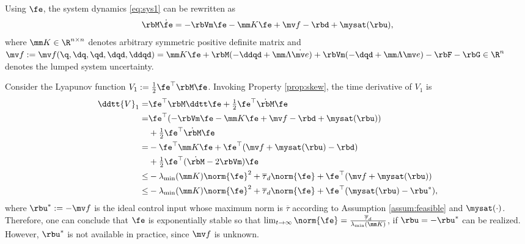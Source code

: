 \documentclass[lettersize,journal]{IEEEtran}
\begin{document}
Using $\fe$, the system dynamics \eqref{eq:sys1} can be rewritten as
\begin{equation}
    \rbM \dot\fe
    =
    -\rbVm \fe
    -\mm K \fe
    + \mv f
    -\rbd + \mysat(\rbu)
    ,
    \label{eq:sys:filtered}
\end{equation}
where $\mm K\in\R^{n\times n}$ denotes arbitrary symmetric positive definite matrix and $
    \mv f:= \mv f(\q,\dq,\qd,\dqd,\ddqd)
    =
    \mm K \fe
    +\rbM(-\ddqd+\mm\Lambda\dot{\mv e})
    +
    \rbVm(-\dqd+\mm\Lambda\mv e)
    -
    \rbF
    -
    \rbG
    \in\R^n
$ denotes the lumped system uncertainty.

Consider the Lyapunov function $V_1:= \tfrac{1}{2}\fe^\top \rbM\fe$. 
Invoking Property \ref{prop:skew}, the time derivative of $V_1$ is
\begin{equation}
    \begin{aligned}
        \ddtt{V}_1
        =&
        \fe^\top \rbM \ddtt \fe
        +
        \tfrac{1}{2}\fe^\top \dot{\rbM}\fe
        \\
        =&
        \fe^\top (
            -\rbVm \fe -\mm K \fe + \mv f
            -\rbd + \mysat(\rbu)
        )
        \\
        &
        +
        \tfrac{1}{2}
        \fe^\top \dot{\rbM}\fe
        \\
        =&
        -
        \fe^\top \mm K \fe 
        +
        \fe^\top (
            \mv f+\mysat(\rbu)
            -\rbd
        )
        \\
        &
        +
        \tfrac{1}{2}
        \fe^\top(\dot{\rbM}- 2\rbVm)\fe
        \\
        \le&
        -\lambda_{\min}(\mm K)\norm{\fe}^2
        +
        \overline\tau_d\norm{\fe}
        +
        \fe^\top (\mv f+\mysat(\rbu))
        \\
        \le&
        -\lambda_{\min}(\mm K)\norm{\fe}^2
        +
        \overline\tau_d\norm{\fe}
        +
        \fe^\top (\mysat(\rbu)-\rbu^*)
        ,
    \end{aligned}
    \label{eq:lya1:dot1}
\end{equation}
where $\rbu^*:= -\mv f$ is the ideal control input whose maximum norm is $\overline\tau$ according to Assumption \ref{assum:feasible} and $\mysat(\cdot)$. 
Therefore, one can conclude that $\fe$ is exponentially stable so that $\lim_{t\to\infty}\norm{\fe}=\tfrac{\overline\tau_d}{\lambda_{\min}(\mm K)}$, if $\rbu=-\rbu^*$ can be realized.
However, $\rbu^*$ is not available in practice, since $\mv f$ is unknown.
\end{document}
